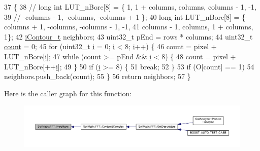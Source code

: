 \begin{DoxyCode}
37                                          \{
38   \textcolor{comment}{// long int LUT\_nBore[8] = \{ 1, 1 + columns, columns, columns - 1, -1,}
39   \textcolor{comment}{// -columns - 1, -columns, -columns + 1 \};}
40   \textcolor{keywordtype}{long} \textcolor{keywordtype}{int} LUT\_nBore[8] = \{-columns + 1, -columns, -columns - 1, -1,
41                            columns - 1,  columns,  1 + columns,  1\};
42   \hyperlink{_soil_math_types_8h_a1ade796add2f13888dfa9e6bde0bdc37}{iContour\_t} neighbors;
43   uint32\_t pEnd = rows * columns;
44   uint32\_t \hyperlink{_comparision_pictures_2_createtest_image_8m_ae11b3deb3de3df7dc48e439074023e35}{count} = 0;
45   \textcolor{keywordflow}{for} (uint32\_t \hyperlink{_comparision_pictures_2_createtest_image_8m_a6f6ccfcf58b31cb6412107d9d5281426}{i} = 0; \hyperlink{_comparision_pictures_2_createtest_image_8m_a6f6ccfcf58b31cb6412107d9d5281426}{i} < 8; \hyperlink{_comparision_pictures_2_createtest_image_8m_a6f6ccfcf58b31cb6412107d9d5281426}{i}++) \{
46     count = pixel + LUT\_nBore[\hyperlink{_comparision_pictures_2_createtest_image_8m_a6f6ccfcf58b31cb6412107d9d5281426}{i}];
47     \textcolor{keywordflow}{while} (count >= pEnd && \hyperlink{_comparision_pictures_2_createtest_image_8m_a6f6ccfcf58b31cb6412107d9d5281426}{i} < 8) \{
48       count = pixel + LUT\_nBore[++\hyperlink{_comparision_pictures_2_createtest_image_8m_a6f6ccfcf58b31cb6412107d9d5281426}{i}];
49     \}
50     \textcolor{keywordflow}{if} (\hyperlink{_comparision_pictures_2_createtest_image_8m_a6f6ccfcf58b31cb6412107d9d5281426}{i} >= 8) \{
51       \textcolor{keywordflow}{break};
52     \}
53     \textcolor{keywordflow}{if} (O[count] == 1)
54       neighbors.push\_back(count);
55   \}
56   \textcolor{keywordflow}{return} neighbors;
57 \}
\end{DoxyCode}


Here is the caller graph for this function\+:\nopagebreak
\begin{figure}[H]
\begin{center}
\leavevmode
\includegraphics[width=350pt]{class_soil_math_1_1_f_f_t_a45b32ad009154112d2fc4e467fc7c5ac_icgraph}
\end{center}
\end{figure}





